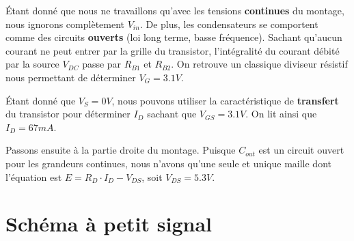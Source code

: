 \documentclass{../../template/tp}
\begin{document}
	{%
	Étant donné que nous ne travaillons qu'avec les tensions \textbf{continues} du montage, nous ignorons complètement $V_{in}$.
	De plus, les condensateurs se comportent comme des circuits \textbf{ouverts} (loi long terme, basse fréquence).
	Sachant qu'aucun courant ne peut entrer par la grille du transistor, l'intégralité du courant débité par la source $V_{DC}$ passe par $R_{B1}$ et $R_{B2}$.
	On retrouve un classique diviseur résistif nous permettant de déterminer $V_G = 3.1 V$.

	Étant donné que $V_S = 0 V$, nous pouvons utiliser la caractéristique de \textbf{transfert} du transistor pour déterminer $I_D$ sachant que $V_{GS} = 3.1 V$. On lit ainsi que $I_D = 67 mA$.

	Passons ensuite à la partie droite du montage.
	Puisque $C_{out}$ est un circuit ouvert pour les grandeurs continues, nous n'avons qu'une seule et unique maille dont l'équation est $E = R_D \cdot I_D - V_{DS}$, soit $V_{DS} = 5.3 V$.

	
	}


\section{Schéma à petit signal}
\end{document}
